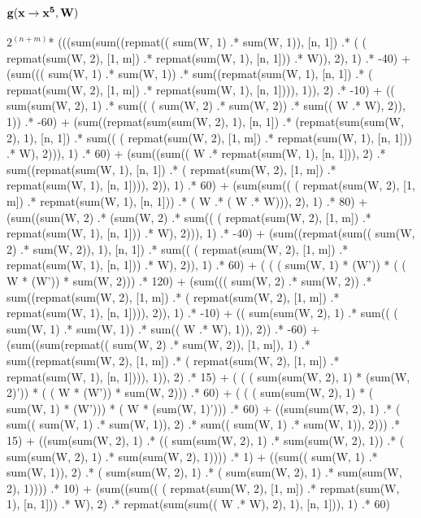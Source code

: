 \documentclass{article}
\begin{document}
\subsection{{$\bf g(x \rightarrow x^5, W)$}}
            $2^{(n+m)}$* (((sum(sum((repmat(( sum(W, 1) .* sum(W, 1)), [n, 1])  .* ( ( repmat(sum(W, 2), [1, m]) .* repmat(sum(W, 1), [n, 1])) .* W)), 2), 1)  .* -40)  
              + (sum((( sum(W, 1) .* sum(W, 1))  .* sum((repmat(sum(W, 1), [n, 1])  .* ( repmat(sum(W, 2), [1, m]) .* repmat(sum(W, 1), [n, 1]))), 1)), 2)  .* -10)  
              + (( sum(sum(W, 2), 1) .* sum(( ( sum(W, 2) .* sum(W, 2)) .* sum(( W .* W), 2)), 1))  .* -60)  
              + (sum((repmat(sum(sum(W, 2), 1), [n, 1])  .* (repmat(sum(sum(W, 2), 1), [n, 1])  .* sum(( ( repmat(sum(W, 2), [1, m]) .* repmat(sum(W, 1), [n, 1])) .* W), 2))), 1)  .* 60)  
              + (sum((sum(( W .* repmat(sum(W, 1), [n, 1])), 2)  .* sum((repmat(sum(W, 1), [n, 1])  .* ( repmat(sum(W, 2), [1, m]) .* repmat(sum(W, 1), [n, 1]))), 2)), 1)  .* 60)  
              + (sum(sum(( ( repmat(sum(W, 2), [1, m]) .* repmat(sum(W, 1), [n, 1])) .* ( W .* ( W .* W))), 2), 1)  .* 80)  
              + (sum((sum(W, 2)  .* (sum(W, 2)  .* sum(( ( repmat(sum(W, 2), [1, m]) .* repmat(sum(W, 1), [n, 1])) .* W), 2))), 1)  .* -40)  
              + (sum((repmat(sum(( sum(W, 2) .* sum(W, 2)), 1), [n, 1])  .* sum(( ( repmat(sum(W, 2), [1, m]) .* repmat(sum(W, 1), [n, 1])) .* W), 2)), 1)  .* 60)  
              + ( ( ( sum(W, 1) * (W')) * ( ( W * (W')) * sum(W, 2))) .* 120)  
              + (sum((( sum(W, 2) .* sum(W, 2))  .* sum((repmat(sum(W, 2), [1, m])  .* ( repmat(sum(W, 2), [1, m]) .* repmat(sum(W, 1), [n, 1]))), 2)), 1)  .* -10)  
              + (( sum(sum(W, 2), 1) .* sum(( ( sum(W, 1) .* sum(W, 1)) .* sum(( W .* W), 1)), 2))  .* -60)  
              + (sum((sum(repmat(( sum(W, 2) .* sum(W, 2)), [1, m]), 1)  .* sum((repmat(sum(W, 2), [1, m])  .* ( repmat(sum(W, 2), [1, m]) .* repmat(sum(W, 1), [n, 1]))), 1)), 2)  .* 15)  
              + ( ( ( sum(sum(W, 2), 1) * (sum(W, 2)')) * ( ( W * (W')) * sum(W, 2))) .* 60)  
              + ( ( ( sum(sum(W, 2), 1) * ( sum(W, 1) * (W'))) * ( W * (sum(W, 1)'))) .* 60)  
              + ((sum(sum(W, 2), 1)  .* ( sum(( sum(W, 1) .* sum(W, 1)), 2) .* sum(( sum(W, 1) .* sum(W, 1)), 2)))  .* 15)  
              + ((sum(sum(W, 2), 1)  .* (( sum(sum(W, 2), 1) .* sum(sum(W, 2), 1))  .* ( sum(sum(W, 2), 1) .* sum(sum(W, 2), 1))))  .* 1)  
              + ((sum(( sum(W, 1) .* sum(W, 1)), 2)  .* ( sum(sum(W, 2), 1) .* ( sum(sum(W, 2), 1) .* sum(sum(W, 2), 1))))  .* 10)  
              + (sum((sum(( ( repmat(sum(W, 2), [1, m]) .* repmat(sum(W, 1), [n, 1])) .* W), 2)  .* repmat(sum(sum(( W .* W), 2), 1), [n, 1])), 1)  .* 60)  
\end{document}
